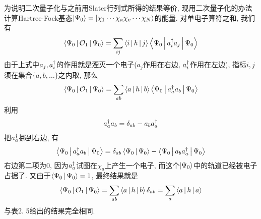 
为说明二次量子化与之前用Slater行列式所得的结果等价, 
现用二次量子化的办法计算Hartree-Fock基态$\Ket{\Psi_0} = \Ket{\chi_1\cdots\chi_a\chi_v\cdots\chi_N}$的能量. 
对单电子算符之和, 
我们有
\begin{align}
\Braket{\Psi_0|\mathcal{O}_1|\Psi_0} = \sum_{ij}\Braket{i|h|j}\Braket{\Psi_0|a^\dagger_i a_j|\Psi_{0}}
\end{align}
由于上式中$a_j,a^\dagger_i$的作用就是湮灭一个电子($a_j$作用在右边, 
$a^\dagger_i$作用在左边), 
指标$i,j$须在集合$\{a,b,\ldots\}$之内取, 
那么
\begin{align}
\Braket{\Psi_0|\mathcal{O}_1|\Psi_0} = \sum_{ab}\Braket{a|h|b}\Braket{\Psi_0|a^\dagger_a a_b|\Psi_{0}}
\end{align}
利用
\begin{align}
a^\dagger_a a_b = \delta_{ab} - a_ba^\dagger_a
\end{align}
把$a^\dagger_a$挪到右边, 
有
\begin{align}
\Braket{\Psi_0|a^\dagger_a a_b|\Psi_0} = \delta_{ab}\Braket{\Psi_0|\Psi_0} - \Braket{\Psi_0|a_ba^\dagger_a|\Psi_0}
\end{align}
右边第二项为$0$, 
因为$a^\dagger_a$试图在$\chi_a$上产生一个电子, 
而这个$\Ket{\Psi_0}$中的轨道已经被电子占据了. 
又由于$\Braket{\Psi_0|\Psi_0} = 1$, 
最终结果就是
\begin{align}
\Braket{\Psi_0|\mathcal{O}_1|\Psi_0} = \sum_{ab} \Braket{a|h|b}\delta_{ab} = \sum_a\Braket{a|h|a}
\end{align} 
与表2.
5给出的结果完全相同.


